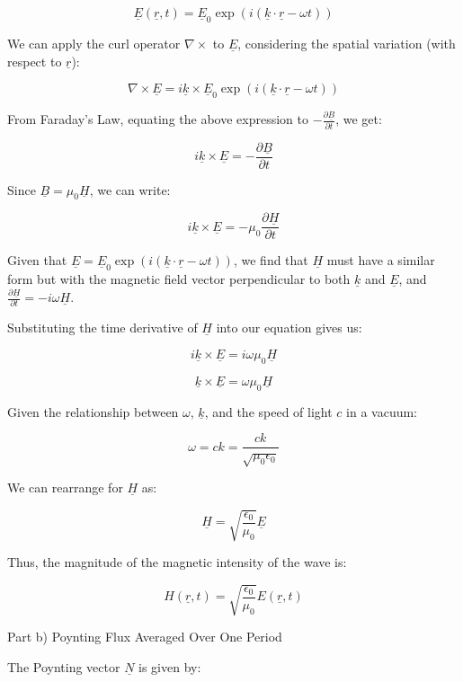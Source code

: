\[
\underline{E}(\underline{r}, t) = \underline{E}_{0} \exp (i(\underline{k} \cdot \underline{r} - \omega t))
\]

We can apply the curl operator \(\nabla \times\) to \(\underline{E}\), considering the spatial variation (with respect to \(\underline{r}\)):

\[
\nabla \times \underline{E} = i\underline{k} \times \underline{E}_{0} \exp (i(\underline{k} \cdot \underline{r} - \omega t))
\]

From Faraday's Law, equating the above expression to \(-\frac{\partial \underline{B}}{\partial t}\), we get:

\[
i\underline{k} \times \underline{E} = -\frac{\partial \underline{B}}{\partial t}
\]

Since \(\underline{B} = \mu_{0} \underline{H}\), we can write:

\[
i\underline{k} \times \underline{E} = -\mu_{0} \frac{\partial \underline{H}}{\partial t}
\]

Given that \(\underline{E} = \underline{E}_{0} \exp (i(\underline{k} \cdot \underline{r} - \omega t))\), we find that \(\underline{H}\) must have a similar form but with the magnetic field vector perpendicular to both \(\underline{k}\) and \(\underline{E}\), and \(\frac{\partial \underline{H}}{\partial t} = -i\omega \underline{H}\).

Substituting the time derivative of \(\underline{H}\) into our equation gives us:

\[
i\underline{k} \times \underline{E} = i\omega\mu_{0} \underline{H}
\]

\[
\underline{k} \times \underline{E} = \omega\mu_{0} \underline{H}
\]

Given the relationship between \(\omega\), \(\underline{k}\), and the speed of light \(c\) in a vacuum:

\[
\omega = ck = \frac{ck}{\sqrt{\mu_{0}\epsilon_{0}}}
\]

We can rearrange for \(\underline{H}\) as:

\[
\underline{H} = \sqrt{\frac{\epsilon_{0}}{\mu_{0}}} \underline{E}
\]

Thus, the magnitude of the magnetic intensity of the wave is:

\[
H(\underline{r}, t) = \sqrt{\frac{\epsilon_{0}}{\mu_{0}}} E(\underline{r}, t)
\]

Part b) Poynting Flux Averaged Over One Period

The Poynting vector \(\underline{N}\) is given by:

